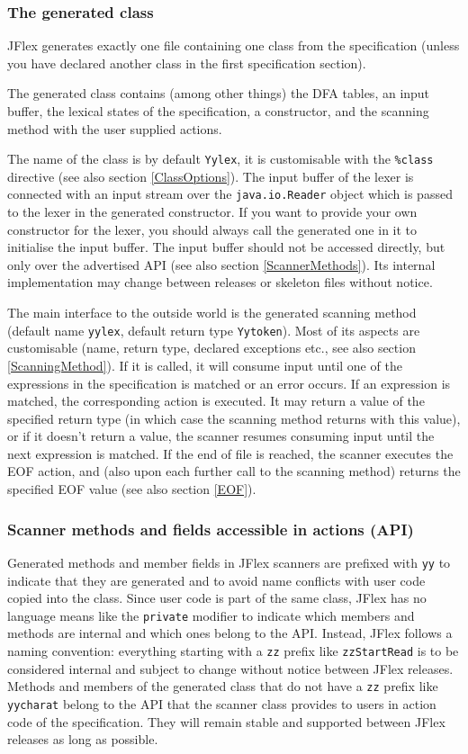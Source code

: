 \documentclass[11pt]{scrartcl}
\begin{document}
\subsubsection{The generated class}
JFlex generates exactly one file containing one class from the specification
(unless you have declared another class in the first specification section).

The generated class contains (among other things) the DFA tables, an input buffer, 
the lexical states of the specification, a constructor, and the scanning method
with the user supplied actions.

The name of the class is by default \texttt{Yylex}, it is customisable
with the \texttt{\%class} directive (see also section
\ref{ClassOptions}). The input buffer of the lexer is connected with an
input stream over the \texttt{java.io.Reader} object which is passed
to the lexer in the generated constructor. If you want to provide your
own constructor for the lexer, you should always call the generated
one in it to initialise the input buffer. The input buffer should not
be accessed directly, but only over the advertised API (see also
section \ref{ScannerMethods}). Its internal implementation may change
between releases or skeleton files without notice.

The main interface to the outside world is the generated scanning
method (default name \texttt{yylex}, default return type
\texttt{Yytoken}). Most of its aspects are customisable (name, return
type, declared exceptions etc., see also section
\ref{ScanningMethod}).  If it is called, it will consume input until
one of the expressions in the specification is matched or an error
occurs. If an expression is matched, the corresponding action is
executed. It may return a value of the specified return type (in which
case the scanning method returns with this value), or if it doesn't
return a value, the scanner resumes consuming input until the next
expression is matched. If the end of file is reached, the scanner
executes the EOF action, and (also upon each further call to the scanning
method) returns the specified EOF value (see also section \ref{EOF}).


\subsubsection{Scanner methods and fields accessible in actions (API)\label{ScannerMethods}}
Generated methods and member fields in JFlex scanners are prefixed
with \texttt{yy} to indicate that they are generated and to avoid name
conflicts with user code copied into the class. Since user code is
part of the same class, JFlex has no language means like the
\texttt{private} modifier to indicate which members and methods are
internal and which ones belong to the API. Instead, JFlex follows a
naming convention: everything starting with a \texttt{zz} prefix like
\texttt{zzStartRead} is to be considered internal and subject to
change without notice between JFlex releases. Methods and members of
the generated class that do not have a \texttt{zz} prefix like
\texttt{yycharat} belong to the API that the scanner class provides to
users in action code of the specification. They will remain stable
and supported between JFlex releases as long as possible.
\end{document}
